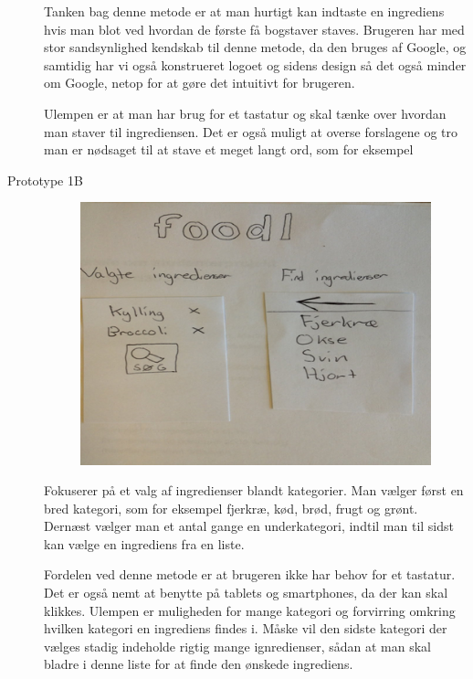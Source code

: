 \begin{description}
Tanken bag denne metode er at man hurtigt kan indtaste en ingrediens hvis man blot ved hvordan de første få bogstaver staves. Brugeren har med stor sandsynlighed kendskab til denne metode, da den bruges af Google, og samtidig har vi også konstrueret logoet og sidens design så det også minder om Google, netop for at gøre det intuitivt for brugeren.

Ulempen er at man har brug for et tastatur og skal tænke over hvordan man staver til ingrediensen. Det er også muligt at overse forslagene og tro man er nødsaget til at stave et meget langt ord, som for eksempel 

\item[Prototype 1B]

\begin{figure}[H]
\centering
\includegraphics[scale=0.7]{billeder/prototyper/prototype1b.png}
\label{fig:prototype1b}
\end{figure}

Fokuserer på et valg af ingredienser blandt kategorier. Man vælger først en bred kategori, som for eksempel fjerkræ, kød, brød, frugt og grønt. Dernæst vælger man et antal gange en underkategori, indtil man til sidst kan vælge en ingrediens fra en liste.

Fordelen ved denne metode er at brugeren ikke har behov for et tastatur. Det er også nemt at benytte på tablets og smartphones, da der kan skal klikkes. Ulempen er muligheden for mange kategori og forvirring omkring hvilken kategori en ingrediens findes i. Måske vil den sidste kategori der vælges stadig indeholde rigtig mange ignredienser, sådan at man skal bladre i denne liste for at finde den ønskede ingrediens. 


\end{description}
